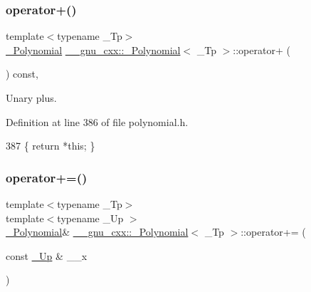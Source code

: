 \subsubsection{\texorpdfstring{operator+()}{operator+()}}
{\footnotesize\ttfamily template$<$typename \+\_\+\+Tp$>$ \\
\hyperlink{class____gnu__cxx_1_1__Polynomial}{\+\_\+\+Polynomial} \hyperlink{class____gnu__cxx_1_1__Polynomial}{\+\_\+\+\_\+gnu\+\_\+cxx\+::\+\_\+\+Polynomial}$<$ \+\_\+\+Tp $>$\+::operator+ (\begin{DoxyParamCaption}{ }\end{DoxyParamCaption}) const\hspace{0.3cm}{\ttfamily [inline]}, {\ttfamily [noexcept]}}

Unary plus. 

Definition at line 386 of file polynomial.\+h.


\begin{DoxyCode}
387       \{ \textcolor{keywordflow}{return} *\textcolor{keyword}{this}; \}
\end{DoxyCode}
\mbox{\label{class____gnu__cxx_1_1__Polynomial_a68658f4f4692cd8a840919123d03995a}} 
\subsubsection{\texorpdfstring{operator+=()}{operator+=()}\hspace{0.1cm}{\footnotesize\ttfamily [1/2]}}
{\footnotesize\ttfamily template$<$typename \+\_\+\+Tp$>$ \\
template$<$typename \+\_\+\+Up $>$ \\
\hyperlink{class____gnu__cxx_1_1__Polynomial}{\+\_\+\+Polynomial}\& \hyperlink{class____gnu__cxx_1_1__Polynomial}{\+\_\+\+\_\+gnu\+\_\+cxx\+::\+\_\+\+Polynomial}$<$ \+\_\+\+Tp $>$\+::operator+= (\begin{DoxyParamCaption}\item[{const \hyperlink{class____gnu__cxx_1_1__Polynomial_a242114d4b86648a5dff67a8221f80d40}{\+\_\+\+Up} \&}]{\+\_\+\+\_\+x }\end{DoxyParamCaption})\hspace{0.3cm}{\ttfamily [inline]}}

